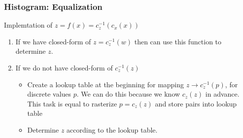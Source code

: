 \documentclass[english,11pt,table,handout]{beamer}
\begin{document}
\begin{frame}[fragile]
\frametitle{Histogram: Equalization}
	
	\begin{block}{Implemtation of $z = f(x) =  c_z^{-1}(c_x(x))$}
		\begin{enumerate}
			\item If we have closed-form of $z = c_z^{-1}(w)$ then can use this function to determine $z$.
			\item If we do not have closed-form of $c_z^{-1}(z)$
			\begin{itemize}
				\item Create a lookup table at the beginning for mapping $z \rightarrow c_z^{-1}(p)$, for discrete values $p$. We can do this because we know $c_z(z)$ in advance. This task is equal to rasterize $p = c_z(z)$ and store pairs into lookup table
				\item Determine $z$ according to the lookup table.
			\end{itemize} 
			
		\end{enumerate}
		
	\end{block}
\end{frame}


\end{document}
